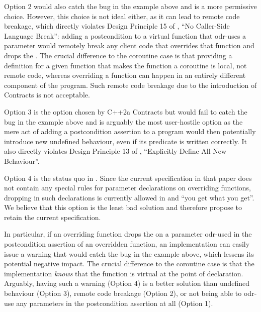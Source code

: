 Option 2 would also catch the bug in the example above and is a more permissive choice. However, this choice is not ideal either, as it can lead to remote code breakage, which directly violates Design Principle 15 of \cite{P2900R10}, ``No Caller-Side Language Break'': adding a postcondition to a virtual function that odr-uses a  parameter would remotely break any client code that overrides that function and drops the . The crucial difference to the coroutine case is that providing a definition for a given function that makes the function a coroutine is local, not remote code, whereas overriding a function can happen in an entirely different component of the program. Such remote code breakage due to the introduction of Contracts is not acceptable.

Option 3 is the option chosen by C++2a Contracts \cite{P0542R5} but would fail to catch the bug in the example above and is arguably the most user-hostile option as the mere act of adding a postcondition assertion to a program would then potentially introduce new undefined behaviour, even if its predicate is written correctly. It also directly violates Design Principle 13 of \cite{P2900R10}, ``Explicitly Define All New Behaviour''.

Option 4 is the status quo in \cite{P2900R10}. Since the current specification in that paper does not contain any special rules for parameter declarations on overriding functions, dropping  in such declarations is currently allowed in \cite{P2900R10} and ``you get what you get''. We believe that this option is the least bad solution and therefore propose to retain the current specification.

In particular, if an overriding function drops the  on a parameter odr-used in the postcondition assertion of an overridden function, an implementation can easily issue a warning that would catch the bug in the example above, which lessens its potential negative impact. The crucial difference to the coroutine case is that the implementation \emph{knows} that the function is virtual at the point of declaration. Arguably, having such a warning (Option 4) is a better solution than undefined behaviour (Option 3), remote code breakage (Option 2), or not being able to odr-use any parameters in the postcondition assertion at all (Option 1).

